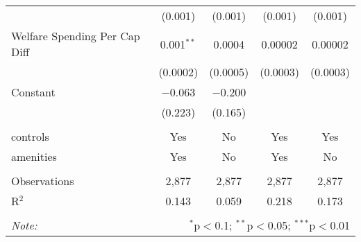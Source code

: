 \begin{table}[!htbp]
\begin{tabular}{@{\extracolsep{5pt}}lcccc}
  & (0.001) & (0.001) & (0.001) & (0.001) \\ 
  Welfare Spending Per Cap Diff & 0.001$^{**}$ & 0.0004 & 0.00002 & 0.00002 \\ 
  & (0.0002) & (0.0005) & (0.0003) & (0.0003) \\ 
  Constant & $-$0.063 & $-$0.200 &  &  \\ 
  & (0.223) & (0.165) &  &  \\ 
 \hline \\[-1.8ex] 
controls & Yes & No & Yes & Yes \\ 
amenities & Yes & No & Yes & No \\ 
\hline \\[-1.8ex] 
Observations & 2,877 & 2,877 & 2,877 & 2,877 \\ 
R$^{2}$ & 0.143 & 0.059 & 0.218 & 0.173 \\ 
\hline 
\hline \\[-1.8ex] 
\textit{Note:}  & \multicolumn{4}{r}{$^{*}$p$<$0.1; $^{**}$p$<$0.05; $^{***}$p$<$0.01} \\ 
\end{tabular} 
\end{table} 
